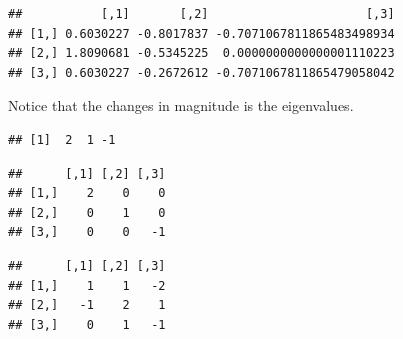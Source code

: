 \documentclass[]{article}
\newenvironment{Shaded}{\begin{snugshade}}{\end{snugshade}}
\newcommand{\DecValTok}[1]{\textcolor[rgb]{0.00,0.00,0.81}{#1}}
\newcommand{\KeywordTok}[1]{\textcolor[rgb]{0.13,0.29,0.53}{\textbf{#1}}}
\newcommand{\NormalTok}[1]{#1}
\newcommand{\OperatorTok}[1]{\textcolor[rgb]{0.81,0.36,0.00}{\textbf{#1}}}
\newcommand{\StringTok}[1]{\textcolor[rgb]{0.31,0.60,0.02}{#1}}
\begin{document}
\begin{Shaded}
\end{Shaded}

\begin{verbatim}
##           [,1]       [,2]                      [,3]
## [1,] 0.6030227 -0.8017837 -0.7071067811865483498934
## [2,] 1.8090681 -0.5345225  0.0000000000000001110223
## [3,] 0.6030227 -0.2672612 -0.7071067811865479058042
\end{verbatim}

Notice that the changes in magnitude is the eigenvalues.

\begin{Shaded}
\end{Shaded}

\begin{verbatim}
## [1]  2  1 -1
\end{verbatim}

\begin{Shaded}
\end{Shaded}

\begin{verbatim}
##      [,1] [,2] [,3]
## [1,]    2    0    0
## [2,]    0    1    0
## [3,]    0    0   -1
\end{verbatim}

\begin{Shaded}
\end{Shaded}

\begin{verbatim}
##      [,1] [,2] [,3]
## [1,]    1    1   -2
## [2,]   -1    2    1
## [3,]    0    1   -1
\end{verbatim}
\end{document}
